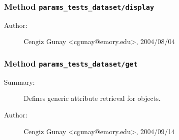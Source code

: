 \subsubsection[Method \texttt{display}]{Method \texttt{params\_tests\_dataset/display}}%
%
\label{ref_params_tests_dataset__display}%
\hypertarget{ref_params_tests_dataset__display}{}%
\begin{description}
%
%
%
%
%
%
%
\item[Author:]%
Cengiz Gunay <cgunay@emory.edu>, 2004/08/04
%
\end{description}
\methodline%
\subsubsection[Method \texttt{get}]{Method \texttt{params\_tests\_dataset/get}}%
%
\label{ref_params_tests_dataset__get}%
\hypertarget{ref_params_tests_dataset__get}{}%
\begin{description}
\item[Summary:]Defines generic attribute retrieval for objects.
%
%
%
%
%
%
%
\item[Author:]%
Cengiz Gunay <cgunay@emory.edu>, 2004/09/14
%
\end{description}
\methodline%
